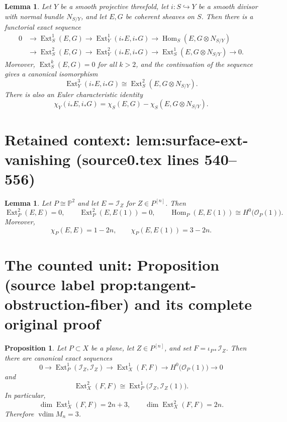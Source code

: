 \documentclass[10pt,a4paper]{amsart}
\newcommand{\Ext}{\operatorname{Ext}}
\newcommand{\Hom}{\operatorname{Hom}}
\newcommand{\I}{\mathcal{I}}
\newcommand{\OO}{\mathcal{O}}
\newcommand{\PP}{\mathbb{P}}
\newcommand{\vdim}{\operatorname{vdim}}
\theoremstyle{plain}
\newtheorem{proposition}[theorem]{Proposition}
\newtheorem{lemma}[theorem]{Lemma}
\theoremstyle{definition}
\theoremstyle{remark}
\begin{document}
\begin{lemma}\label{lem:ext-sequence}
Let $Y$ be a smooth projective threefold, let $i\colon S\hookrightarrow Y$ be a smooth divisor with normal bundle $N_{S/Y}$, and let $E,G$ be coherent sheaves on $S$.
Then there is a functorial exact sequence
\begin{align*}
0 &\to \Ext^1_S(E,G)
\to \Ext^1_Y(i_*E,i_*G)
\to \Hom_S(E,G\otimes N_{S/Y}) \\
&\to \Ext^2_S(E,G)
\to \Ext^2_Y(i_*E,i_*G)
\to \Ext^1_S(E,G\otimes N_{S/Y}) \to 0.
\end{align*}
Moreover, $\Ext^k_S(E,G)=0$ for all $k>2$, and the continuation of the sequence gives a canonical isomorphism
\[
\Ext^3_Y(i_*E,i_*G)\cong \Ext^2_S(E,G\otimes N_{S/Y}).
\]
There is also an Euler characteristic identity
\begin{equation}\label{eq:chi-general}
\chi_Y(i_*E,i_*G)=\chi_S(E,G)-\chi_S(E,G\otimes N_{S/Y}).
\end{equation}
\end{lemma}


\section*{Retained context: lem:surface-ext-vanishing (source0.tex lines 540--556)}

\begin{lemma}\label{lem:surface-ext-vanishing}
Let $P\cong \PP^2$ and let $E=\I_Z$ for $Z\in P^{[n]}$.
Then
\[
\Ext^2_P(E,E)=0,
\qquad
\Ext^2_P(E,E(1))=0,
\qquad
\Hom_P(E,E(1))\cong H^0\bigl(\OO_P(1)\bigr).
\]
Moreover,
\[
\chi_P(E,E)=1-2n,
\qquad
\chi_P(E,E(1))=3-2n.
\]
\end{lemma}


\section{The counted unit: Proposition (source label prop:tangent-obstruction-fiber) and its complete original proof}

\begin{proposition}\label{prop:tangent-obstruction-fiber}
Let $P\subset X$ be a plane, let $Z\in P^{[n]}$, and set $F=\iota_{P*}\I_Z$.
Then there are canonical exact sequences
\begin{equation}\label{eq:tangent-exact-fiber}
0\longrightarrow \Ext^1_P(\I_Z,\I_Z)
\longrightarrow \Ext^1_X(F,F)
\longrightarrow H^0\bigl(\OO_P(1)\bigr)
\longrightarrow 0
\end{equation}
and
\begin{equation}\label{eq:obstruction-fiber}
\Ext^2_X(F,F)\cong \Ext^1_P\bigl(\I_Z,\I_Z(1)\bigr).
\end{equation}
In particular,
\[
\dim \Ext^1_X(F,F)=2n+3,
\qquad
\dim \Ext^2_X(F,F)=2n.
\]
Therefore $\vdim M_n=3$.
\end{proposition}
\end{document}
